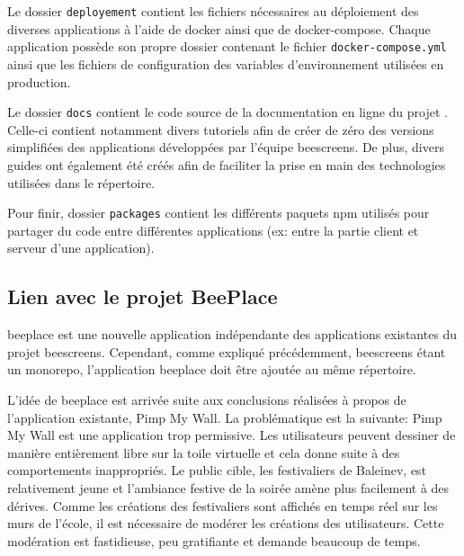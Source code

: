 Le dossier \texttt{deployement} contient les fichiers nécessaires au déploiement des diverses applications à l'aide de \gls{docker} ainsi que de \gls{docker-compose}. Chaque application possède son propre dossier contenant le fichier  \texttt{docker-compose.yml} ainsi que les fichiers de configuration des variables d'environnement utilisées en production.

Le dossier \texttt{docs} contient le code source de la documentation en ligne du projet \cite{beescreensdocs}. Celle-ci contient notamment divers tutoriels afin de créer de zéro des versions simplifiées des applications développées par l'équipe \gls{beescreens}. De plus, divers guides ont également été créés afin de faciliter la prise en main des technologies utilisées dans le répertoire.

Pour finir, dossier \texttt{packages} contient les différents paquets \gls{npm} utilisés pour partager du code entre différentes applications (ex: entre la partie client et serveur d'une application).





\subsection{Lien avec le projet BeePlace}
\label{sec:lien-avec-le-projet-beeplace}

\gls{beeplace} est une nouvelle application indépendante des applications existantes du projet \gls{beescreens}. Cependant, comme expliqué précédemment, \gls{beescreens} étant un monorepo, l'application \gls{beeplace} doit être ajoutée au même répertoire.

L'idée de \gls{beeplace} est arrivée suite aux conclusions réalisées à propos de l'application existante, Pimp My Wall. La problématique est la suivante: Pimp My Wall est une application trop permissive. Les utilisateurs peuvent dessiner de manière entièrement libre sur la toile virtuelle et cela donne suite à des comportements inappropriés. Le public cible, les festivaliers de Baleinev, est relativement jeune et l'ambiance festive de la soirée amène plus facilement à des dérives. Comme les créations des festivaliers sont affichés en temps réel sur les murs de l'école, il est nécessaire de modérer les créations des utilisateurs. Cette modération est fastidieuse, peu gratifiante et demande beaucoup de temps.

